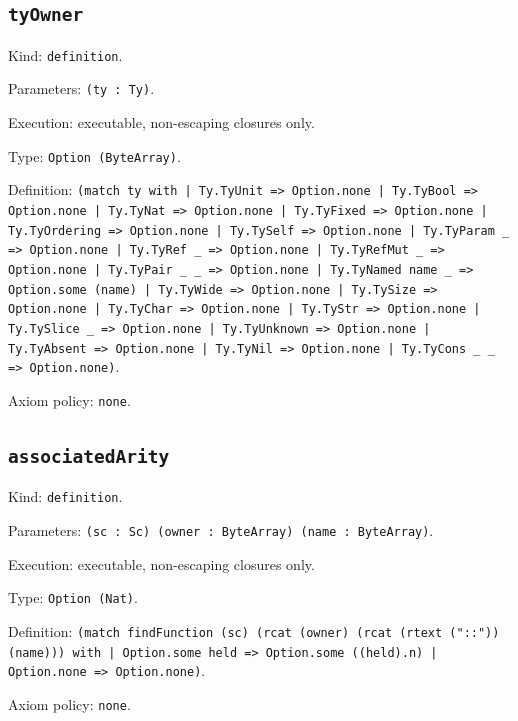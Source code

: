 \documentclass[11pt]{article}
\begin{document}
\subsection*{\texttt{tyOwner}}
\noindent Kind: \texttt{definition}.\par
\noindent Parameters: \texttt{(ty : Ty)}.\par
\noindent Execution: executable, non-escaping closures only.\par
\noindent Type: \texttt{Option (ByteArray)}.\par
\noindent Definition: \texttt{(match ty with | Ty.TyUnit => Option.none | Ty.TyBool => Option.none | Ty.TyNat => Option.none | Ty.TyFixed => Option.none | Ty.TyOrdering => Option.none | Ty.TySelf => Option.none | Ty.TyParam \_ => Option.none | Ty.TyRef \_ => Option.none | Ty.TyRefMut \_ => Option.none | Ty.TyPair \_ \_ => Option.none | Ty.TyNamed name \_ => Option.some (name) | Ty.TyWide => Option.none | Ty.TySize => Option.none | Ty.TyChar => Option.none | Ty.TyStr => Option.none | Ty.TySlice \_ => Option.none | Ty.TyUnknown => Option.none | Ty.TyAbsent => Option.none | Ty.TyNil => Option.none | Ty.TyCons \_ \_ => Option.none)}.\par
\noindent Axiom policy: \texttt{none}.\par
\subsection*{\texttt{associatedArity}}
\noindent Kind: \texttt{definition}.\par
\noindent Parameters: \texttt{(sc : Sc) (owner : ByteArray) (name : ByteArray)}.\par
\noindent Execution: executable, non-escaping closures only.\par
\noindent Type: \texttt{Option (Nat)}.\par
\noindent Definition: \texttt{(match findFunction (sc) (rcat (owner) (rcat (rtext ("::")) (name))) with | Option.some held => Option.some ((held).n) | Option.none => Option.none)}.\par
\noindent Axiom policy: \texttt{none}.\par
\end{document}
